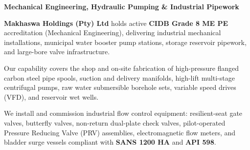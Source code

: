 \documentclass[a4paper,11pt]{article}
\begin{document}
\noindent
\begin{minipage}[t]{0.62\textwidth}
    \vspace{0pt}
    {\large\bfseries\color{mhnavy} Mechanical Engineering, Hydraulic Pumping \& Industrial Pipework}
    \vspace{0.12cm}

    {\fontsize{9pt}{13pt}\selectfont\color{mhtext}
    \textbf{Makhaswa Holdings (Pty) Ltd} holds active \textbf{CIDB Grade 8 ME PE} accreditation (Mechanical Engineering), delivering industrial mechanical installations, municipal water booster pump stations, storage reservoir pipework, and large-bore valve infrastructure.
    }

    \vspace{0.22cm}

    {\fontsize{9pt}{13pt}\selectfont\color{mhtext}
    Our capability covers the shop and on-site fabrication of high-pressure flanged carbon steel pipe spools, suction and delivery manifolds, high-lift multi-stage centrifugal pumps, raw water submersible borehole sets, variable speed drives (VFD), and reservoir wet wells.
    }

    \vspace{0.22cm}

    {\fontsize{9pt}{13pt}\selectfont\color{mhtext}
    We install and commission industrial flow control equipment: resilient-seat gate valves, butterfly valves, non-return dual-plate check valves, pilot-operated Pressure Reducing Valve (PRV) assemblies, electromagnetic flow meters, and bladder surge vessels compliant with \textbf{SANS 1200 HA} and \textbf{API 598}.
    }
\end{minipage}
\hfill
\end{document}
